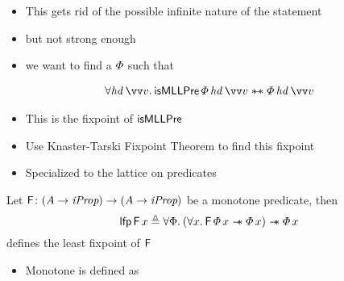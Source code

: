 \documentclass[thesis.tex]{subfiles}
\begin{document}
\begin{itemize}
    \item This gets rid of the possible infinite nature of the statement
    \item but not strong enough
    \item we want to find a $\varPhi$ such that
\end{itemize}
\begin{align*}
    \All \langv{hd}\, \vect{v}. \textlog{isMLLPre}\, \pred\, \langv{hd}\, \vect{v} \wandIff \pred\, \langv{hd}\, \vect{v}
\end{align*}
\begin{itemize}
    \item This is the fixpoint of $\textsf{\upshape isMLLPre}$
    \item Use Knaster-Tarski Fixpoint Theorem to find this fixpoint \cite*{tarskiLatticetheoreticalFixpointTheorem1955}
    \item Specialized to the lattice on predicates
\end{itemize}
\begin{theorem}
    \label{thm:tarski}
    Let $\textsf{\upshape F}\colon (A \to \textit{iProp}) \to (A \to \textit{iProp})$ be a monotone predicate, then
    \[\lfp\, \hopred\, \var \eqdef \All \Phi. (\All \var. \hopred\, \pred\, \var \wand \pred\, \var) \wand \pred \, \var\]
    defines the least fixpoint of $\textsf{\upshape F}$
\end{theorem}
\begin{itemize}
    \item Monotone is defined as
\end{itemize}
\end{document}
